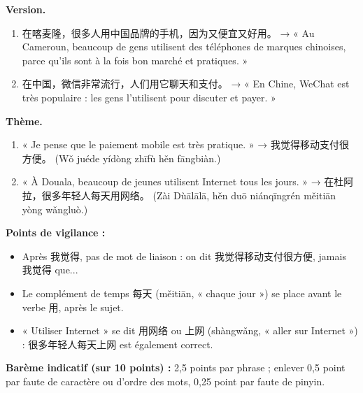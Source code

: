 \documentclass[11pt]{article}
\begin{document}
\begin{corrige}
\textbf{Version.}
\begin{enumerate}
\item 在喀麦隆，很多人用中国品牌的手机，因为又便宜又好用。 → « Au Cameroun, beaucoup de gens utilisent des téléphones de marques chinoises, parce qu'ils sont à la fois bon marché et pratiques. »
\item 在中国，微信非常流行，人们用它聊天和支付。 → « En Chine, WeChat est très populaire : les gens l'utilisent pour discuter et payer. »
\end{enumerate}
\textbf{Thème.}
\begin{enumerate}
\item « Je pense que le paiement mobile est très pratique. » → 我觉得移动支付很方便。 (Wǒ juéde yídòng zhīfù hěn fāngbiàn.)
\item « À Douala, beaucoup de jeunes utilisent Internet tous les jours. » → 在杜阿拉，很多年轻人每天用网络。 (Zài Dùālālā, hěn duō niánqīngrén měitiān yòng wǎngluò.)
\end{enumerate}
\textbf{Points de vigilance :}
\begin{itemize}
\item Après 我觉得, pas de mot de liaison : on dit 我觉得移动支付很方便, jamais 我觉得 que...
\item Le complément de temps 每天 (měitiān, « chaque jour ») se place avant le verbe 用, après le sujet.
\item « Utiliser Internet » se dit 用网络 ou 上网 (shàngwǎng, « aller sur Internet ») : 很多年轻人每天上网 est également correct.
\end{itemize}
\textbf{Barème indicatif (sur 10 points) :} 2,5 points par phrase ; enlever 0,5 point par faute de caractère ou d'ordre des mots, 0,25 point par faute de pinyin.
\end{corrige}
\end{document}
